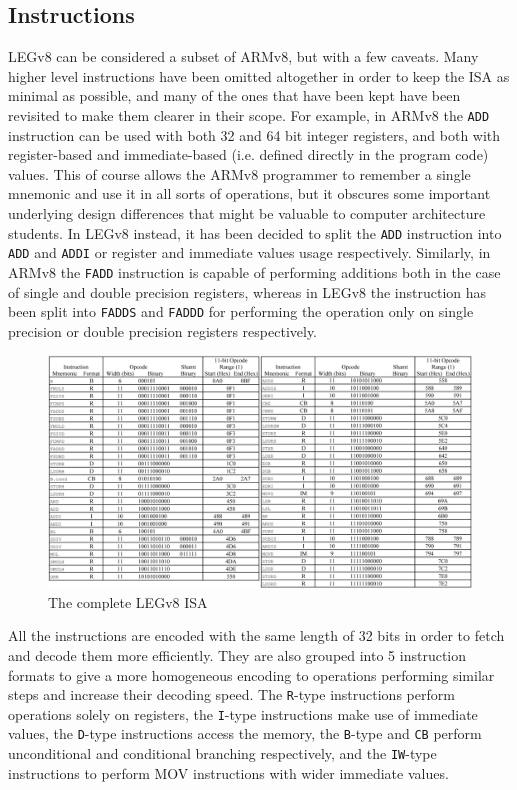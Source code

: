 \subsection*{Instructions}
LEGv8 can be considered a subset of ARMv8, but with a few caveats. Many higher level instructions have been omitted altogether in order to keep the ISA as minimal as possible, and many of the ones that have been kept have been revisited to make them clearer in their scope. For example, in ARMv8 the \verb|ADD| instruction can be used with both 32 and 64 bit integer registers, and both with register-based and immediate-based (i.e. defined directly in the program code) values. This of course allows the ARMv8 programmer to remember a single mnemonic and use it in all sorts of operations, but it obscures some important underlying design differences that might be valuable to computer architecture students. In LEGv8 instead, it has been decided to split the \verb|ADD| instruction into \verb|ADD| and \verb|ADDI| or register and immediate values usage respectively. Similarly, in ARMv8 the \verb|FADD| instruction is capable of performing additions both in the case of single and double precision registers, whereas in LEGv8 the instruction has been split into \verb|FADDS| and \verb|FADDD| for performing the operation only on single precision or double precision registers respectively.
\begin{figure}[H]
	\centering
	\includegraphics[width=.8\textwidth]{img/legv8_instruction_set.png}
	\caption{The complete LEGv8 ISA}
\end{figure}
All the instructions are encoded with the same length of 32 bits in order to fetch and decode them more efficiently. They are also grouped into 5 instruction formats to give a more homogeneous encoding to operations performing similar steps and increase their decoding speed.
The \verb|R|-type instructions perform operations solely on registers, the \verb|I|-type instructions make use of immediate values, the \verb|D|-type instructions access the memory, the \verb|B|-type and \verb|CB| perform unconditional and conditional branching respectively, and the \verb|IW|-type instructions to perform MOV instructions with wider immediate values.
